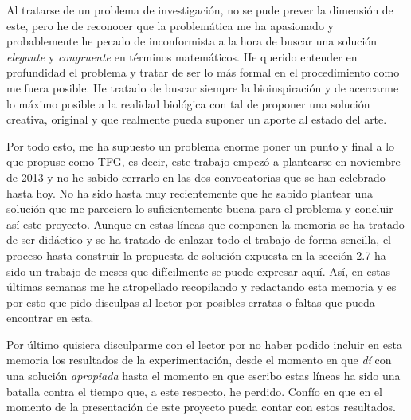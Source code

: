 \documentclass[10pt,a4paper]{report}
\begin{document}
Al tratarse de un problema de investigación, no se pude prever la dimensión de este, pero he de reconocer que la problemática me ha apasionado y probablemente he pecado de inconformista a la hora de buscar una solución \textit{elegante} y \textit{congruente} en términos matemáticos. He querido entender en profundidad el problema y tratar de ser lo más formal en el procedimiento como me fuera posible. He tratado de buscar siempre la bioinspiración y de acercarme lo máximo posible a la realidad biológica con tal de proponer una solución creativa, original y que realmente pueda suponer un aporte al estado del arte.

Por todo esto, me ha supuesto un problema enorme poner un punto y final a lo que propuse como TFG, es decir, este trabajo empezó a plantearse en noviembre de 2013 y no he sabido cerrarlo en las dos convocatorias que se han celebrado hasta hoy. No ha sido hasta muy recientemente que he sabido plantear una solución que me pareciera lo suficientemente buena para el problema y concluir así este proyecto. Aunque en estas líneas que componen la memoria se ha tratado de ser didáctico y se ha tratado de enlazar todo el trabajo de forma sencilla, el proceso hasta construir la propuesta de solución expuesta en la sección 2.7 ha sido un trabajo de meses que difícilmente se puede expresar aquí. Así, en estas últimas semanas me he atropellado recopilando y redactando esta memoria y es por esto que pido disculpas al lector por posibles erratas o faltas que pueda encontrar en esta.

Por último quisiera disculparme con el lector por no haber podido incluir en esta memoria los resultados de la experimentación, desde el momento en que \textit{dí} con una solución \textit{apropiada} hasta el momento en que escribo estas líneas ha sido una batalla contra el tiempo que, a este respecto, he perdido. Confío en que en el momento de la presentación de este proyecto pueda contar con estos resultados.




\end{document}
